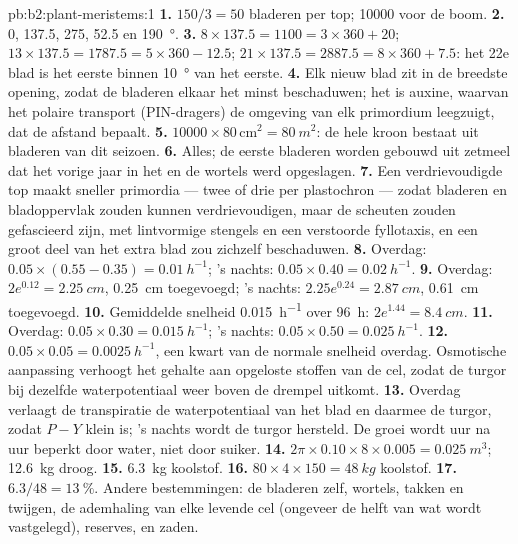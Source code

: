 \begin{solution}{pb:b2:plant-meristems:1}
\textbf{1.} $150/3 = 50$ bladeren per top; \num{10000} voor de boom.
\textbf{2.} 0, 137.5, 275, 52.5 en \qty{190}{\degree}.
\textbf{3.} $8\times 137.5 = 1100 = 3\times 360 + 20$; $13\times 137.5
= 1787.5 = 5\times 360 - 12.5$; $21\times 137.5 = 2887.5 = 8\times 360
+ 7.5$: het 22e blad is het eerste binnen \qty{10}{\degree} van het
eerste.
\textbf{4.} Elk nieuw blad zit in de breedste opening, zodat de bladeren
elkaar het minst beschaduwen; het is auxine, waarvan het polaire transport
(PIN-dragers) de omgeving van elk primordium leegzuigt, dat de afstand
bepaalt.
\textbf{5.} $\num{10000}\times 80\,\text{cm}^{2} = \qty{80}{m^2}$: de
hele kroon bestaat uit bladeren van dit seizoen.
\textbf{6.} Alles; de eerste bladeren worden gebouwd uit zetmeel dat het
vorige jaar in het  en de wortels werd opgeslagen.
\textbf{7.} Een verdrievoudigde top maakt sneller primordia --- twee of
drie per plastochron --- zodat bladeren en bladoppervlak zouden kunnen
verdrievoudigen, maar de scheuten zouden gefascieerd zijn, met lintvormige
stengels en een verstoorde fyllotaxis, en een groot deel van het extra blad
zou zichzelf beschaduwen.
\textbf{8.} Overdag: $0.05\times(0.55 - 0.35) = \qty{0.01}{h^{-1}}$;
's nachts: $0.05\times 0.40 = \qty{0.02}{h^{-1}}$.
\textbf{9.} Overdag: $2e^{0.12} = \qty{2.25}{cm}$, \qty{0.25}{cm}
toegevoegd; 's nachts: $2.25e^{0.24} = \qty{2.87}{cm}$, \qty{0.61}{cm}
toegevoegd.
\textbf{10.} Gemiddelde snelheid \qty{0.015}{h^{-1}} over \qty{96}{h}: $2e^{1.44}
= \qty{8.4}{cm}$.
\textbf{11.} Overdag: $0.05\times 0.30 = \qty{0.015}{h^{-1}}$; 's nachts:
$0.05\times 0.50 = \qty{0.025}{h^{-1}}$.
\textbf{12.} $0.05\times 0.05 = \qty{0.0025}{h^{-1}}$, een kwart van de
normale snelheid overdag. Osmotische aanpassing verhoogt het gehalte aan
opgeloste stoffen van de cel, zodat de turgor bij dezelfde waterpotentiaal
weer boven de drempel uitkomt.
\textbf{13.} Overdag verlaagt de transpiratie de waterpotentiaal van het
blad en daarmee de turgor, zodat $P - Y$ klein is; 's nachts wordt de
turgor hersteld. De groei wordt uur na uur beperkt door water, niet door
suiker.
\textbf{14.} $2\pi\times 0.10\times 8\times 0.005 = \qty{0.025}{m^3}$;
\qty{12.6}{kg} droog.
\textbf{15.} \qty{6.3}{kg} koolstof.
\textbf{16.} $80\times 4\times 150 = \qty{48}{kg}$ koolstof.
\textbf{17.} $6.3/48 = \qty{13}{\%}$. Andere bestemmingen: de bladeren
zelf, wortels, takken en twijgen, de ademhaling van elke levende cel
(ongeveer de helft van wat wordt vastgelegd), reserves,  en zaden.

\end{solution}
